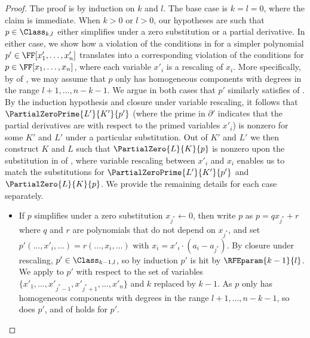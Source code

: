 \begin{proof}
  The proof is by induction on \(k\) and \(l\).
  The base case is \(k=l=0\), where the claim is immediate.
  When \(k>0\) or \(l > 0\), our hypotheses are such that $p \in \Class_{k,l}$ either simplifies under a zero substitution
  or a partial derivative. In either case, we show how a violation of the conditions in  for a simpler polynomial $p' \in \FF[x'_1,\dots,x'_n]$ translates into a corresponding violation of the conditions for $p \in \FF[x_1,\dots,x_n]$, where each variable $x'_i$ is a rescaling of $x_i$. More specifically, by  of
  , we may assume that $p$ only has homogeneous components with degrees in the range
  $l+1,\ldots,n-k-1$. We argue in both cases that $p'$ similarly satisfies  of
  . By the induction hypothesis and closure under variable rescaling, it follows that $\PartialZeroPrime{L'}{K'}{p'}$ (where the prime in $\partial'$ indicates that the partial derivatives are with respect to the primed variables $x'_i$) is nonzero for some $K'$ and $L'$ under a particular substitution. Out of $K'$ and $L'$ we then construct $K$ and $L$ such that $\PartialZero{L}{K}{p}$ is nonzero upon the substitution in  of
  , where variable rescaling between $x'_i$ and $x_i$ enables us to match the substitutions for $\PartialZeroPrime{L'}{K'}{p'}$ and $\PartialZero{L}{K}{p}$. We provide the remaining details for each case separately.
  \begin{itemize}
    \item
      If $p$ simplifies under a zero substitution $x_{j^*}\gets 0$, then
      write $p$ as $p = q x_{j^*} + r$ where $q$ and $r$ are
      polynomials that do not depend on $x_{j^*}$,
      and set $p'(\dots,x'_i,\dots)=r(\dots,x_i,\dots)$ with $x_i=x'_i \cdot (a_i-a_{j^*})$.
      By closure under rescaling, $p'\in \Class_{k-1,l}$, so by induction $p'$ is hit by \(\RFEparam{k-1}{l}\).
      We apply  to $p'$ with respect to the set of variables \(\{x'_1,\ldots,x'_{j^*-1},x'_{j^*+1},\ldots,x'_n\}\) and $k$ replaced by $k-1$.
      As $p$ only has homogeneous components with degrees in the range $l+1,\ldots,n-k-1$, so does $p'$,
      and  of
       holds for $p'$.

\end{itemize}
\end{proof}
